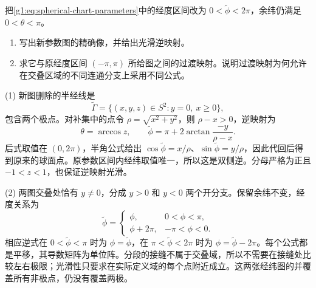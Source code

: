 \BookExercises

\begin{exercise}
	\label{g1:ex:longitude-cut-transition}
	把\eqref{g1:eq:spherical-chart-parameters}中的经度区间改为 \(0<\widetilde\phi<2\pi\)，余纬仍满足 \(0<\theta<\pi\)。
	\begin{enumerate}
		\item 写出新参数图的精确像，并给出光滑逆映射。
		\item 求它与原经度区间 \((-\pi,\pi)\) 所给图之间的过渡映射。说明过渡映射为何允许在交叠区域的不同连通分支上采用不同公式。
	\end{enumerate}
\end{exercise}
\begin{solution}
	(1) 新图删除的半经线是
	\[
		\widetilde\Gamma=\{(x,y,z)\in S^2:y=0,\ x\ge0\},
	\]
	包含两个极点。对补集中的点令 \(\rho=\sqrt{x^2+y^2}\)，则 \(\rho-x>0\)，逆映射为
	\[
		\theta=\arccos z,\qquad
		\widetilde\phi=\pi+2\arctan\frac{-y}{\rho-x}.
	\]
	后式取值在 \((0,2\pi)\)，半角公式给出 \(\cos\widetilde\phi=x/\rho\)、\(\sin\widetilde\phi=y/\rho\)，因此代回后得到原来的球面点。原参数区间内经纬取值唯一，所以这是双侧逆。分母严格为正且 \(-1<z<1\)，也保证逆映射光滑。

	(2) 两图交叠处恰有 \(y\ne0\)，分成 \(y>0\) 和 \(y<0\) 两个开分支。保留余纬不变，经度关系为
	\[
		\widetilde\phi=
		\begin{cases}
			\phi,&0<\phi<\pi,\\
			\phi+2\pi,&-\pi<\phi<0.
		\end{cases}
	\]
	相应逆式在 \(0<\widetilde\phi<\pi\) 时为 \(\phi=\widetilde\phi\)，在 \(\pi<\widetilde\phi<2\pi\) 时为 \(\phi=\widetilde\phi-2\pi\)。每个公式都是平移，其导数矩阵为单位阵。分段的接缝不属于交叠域，所以不需要在接缝处比较左右极限；光滑性只要求在实际定义域的每个点附近成立。这两张经纬图的并覆盖所有非极点，仍没有覆盖两极。
\end{solution}

